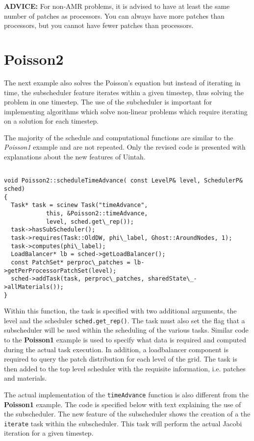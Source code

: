\documentclass[12pt]{report}
\begin{document}
\textbf{ADVICE:} For non-AMR problems, it is advised to have at least
the same number of patches as processors.  You can always have more
patches than processors, but you cannot have fewer patches than
processors.


\section{Poisson2}

The next example also solves the Poisson's equation but instead of
iterating in time, the subscheduler feature iterates within a given
timestep, thus solving the problem in one timestep.  The use of the
subcheduler is important for implementing algorithms which solve
non-linear problems which require iterating on a solution for each
timestep.

The majority of the schedule and computational functions are similar
to the \emph{Poisson1} example and are not repeated.  Only the revised
code is presented with explanations about the new features of Uintah.

\begin{verbatim}

void Poisson2::scheduleTimeAdvance( const LevelP& level, SchedulerP& sched)
{
  Task* task = scinew Task("timeAdvance",
			this, &Poisson2::timeAdvance,
			level, sched.get\_rep());
  task->hasSubScheduler();
  task->requires(Task::OldDW, phi\_label, Ghost::AroundNodes, 1);
  task->computes(phi\_label);
  LoadBalancer* lb = sched->getLoadBalancer();
  const PatchSet* perproc\_patches = lb->getPerProcessorPatchSet(level);
  sched->addTask(task, perproc\_patches, sharedState\_->allMaterials());
}

\end{verbatim}

Within this function, the task is specified with two additional
arguments, the level and the scheduler \texttt{sched.get\_rep()}.  The
task must also set the flag that a subscheduler will be used within
the scheduling of the various tasks.  Similar code to the
\textbf{Poisson1} example is used to specify what data is required and
computed during the actual task execution.  In addition, a
loadbalancer component is required to query the patch distribution for
each level of the grid.  The task is then added to the top level
scheduler with the requisite information, i.e. patches and materials.

The actual implementation of the \texttt{timeAdvance} function is also
different from the \textbf{Poisson1} example.  The code is specified
below with text explaining the use of the subscheduler.  The new
feature of the subscheduler shows the creation of a the
\texttt{iterate} task within the subscheduler.  This task will perform
the actual Jacobi iteration for a given timestep.
\end{document}
